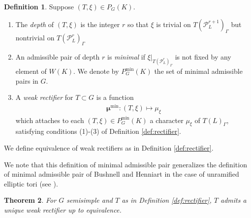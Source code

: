 \documentclass[11pt]{amsart}
\theoremstyle{plain}
\newtheorem{theorem}{Theorem}[section]
\theoremstyle{definition}
\newtheorem{definition}[theorem]{Definition}
\newcommand{\PL}{\mathcal{P}_L}
\newcommand{\Pmin}{P_G^{\min}}
\newcommand{\bmu}{\boldsymbol\mu}
\newcommand{\mumin}{\bmu^{\min}}
\begin{document}
\begin{definition}\label{def:general_pair}
Suppose $(T, \xi) \in P_G(K)$.
\begin{enumerate}
\item The \emph{depth} of $(T, \xi)$ is the integer $r$ so that $\xi$
is trivial on $T(\PL^{r+1})_{\Gamma}$ but nontrivial on
$T(\PL^{r})_{\Gamma}$
\item An admissible pair of depth $r$ is \emph{minimal}
if $\xi|_{T(\PL^{r})_{\Gamma}}$
is not fixed by any element of $W(K)$.
We denote by $\Pmin(K)$ the set
of minimal admissible pairs in $G$.
\item A \emph{weak rectifier} for $T \subset G$ is a function
\begin{align*}
\mumin : (T, \xi) \mapsto \mu_{\xi}
\end{align*}
which attaches to each $(T, \xi) \in \Pmin(K)$ a character
  $\mu_{\xi}$ of $T(L)_{\Gamma}$, satisfying conditions (1)-(3)
  of Definition \ref{def:rectifier}.
\end{enumerate}
We define equivalence of weak rectifiers as in Definition \ref{def:rectifier}.
\end{definition}

We note that this definition of minimal admissible pair generalizes
the definition of minimal admissible pair of Bushnell and Henniart in
the case of unramified elliptic tori (see \cite[\S2.2]{bushnell-henniart:05a}).

\begin{theorem} \label{thm:unique_semisimple}
For $G$ semisimple and $T$ as in Definition \ref{def:rectifier}, $T$ admits a unique weak rectifier up to equivalence.
\end{theorem}
\end{document}
